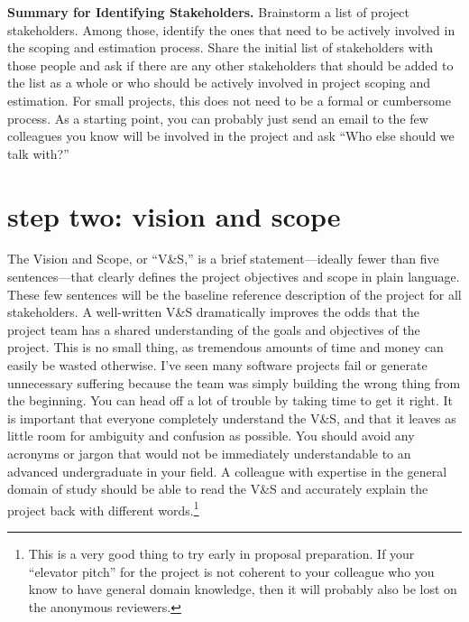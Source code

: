 \documentclass[12pt,oneside]{book}
\begin{document}
\hfill
\begin{mdframed}[everyline=true]
\textbf{Summary for Identifying Stakeholders.} Brainstorm a list of project stakeholders. Among those, identify the ones that need to be actively involved in the scoping and estimation process. Share the initial list of stakeholders with those people and ask if there are any other stakeholders that should be added to the list as a whole or who should be actively involved in project scoping and estimation. For small projects, this does not need to be a formal or cumbersome process. As a starting point, you can probably just send an email to the few colleagues you know will be involved in the project and ask ``Who else should we talk with?''
\end{mdframed}

\newpage
{}
\section*{step two: vision and scope}

The Vision and Scope, or ``V\&S,'' is a brief statement---ideally fewer than five sentences---that clearly defines the project objectives and scope in plain language. These few sentences will be the baseline reference description of the project for all stakeholders. A well-written V\&S dramatically improves the odds that the project team has a shared understanding of the goals and objectives of the project. This is no small thing, as tremendous amounts of time and money can easily be wasted otherwise. I've seen many software projects fail or generate unnecessary suffering because the team was simply building the wrong thing from the beginning. You can head off a lot of trouble by taking time to get it right. It is important that everyone completely understand the V\&S, and that it leaves as little room for ambiguity and confusion as possible. You should avoid any acronyms or jargon that would not be immediately understandable to an advanced undergraduate in your field. A colleague with expertise in the general domain of study should be able to read the V\&S and accurately explain the project back with different words.\footnote{
This is a very good thing to try early in proposal preparation. If your ``elevator pitch'' for the project is not coherent to your colleague who you know to have general domain knowledge, then it will probably also be lost on the anonymous reviewers.}
\end{document}
